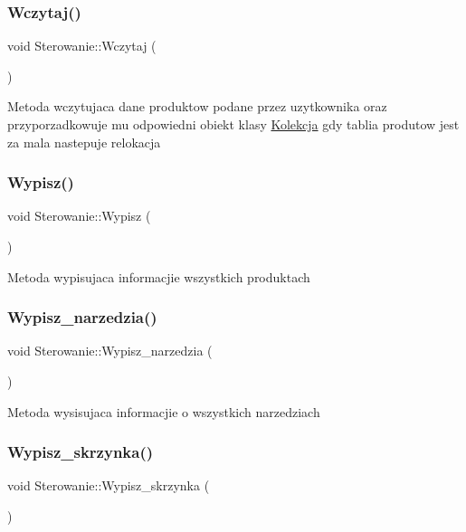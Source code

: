 \subsubsection{\texorpdfstring{Wczytaj()}{Wczytaj()}}
{\footnotesize\ttfamily void Sterowanie\+::\+Wczytaj (\begin{DoxyParamCaption}{ }\end{DoxyParamCaption})}

Metoda wczytujaca dane produktow podane przez uzytkownika oraz przyporzadkowuje mu odpowiedni obiekt klasy \mbox{\hyperlink{class_kolekcja}{Kolekcja}} gdy tablia produtow jest za mala nastepuje relokacja \mbox{\label{class_sterowanie_a13ce815612492fcc3837c7779def228e}} 
\subsubsection{\texorpdfstring{Wypisz()}{Wypisz()}}
{\footnotesize\ttfamily void Sterowanie\+::\+Wypisz (\begin{DoxyParamCaption}{ }\end{DoxyParamCaption})}

Metoda wypisujaca informacjie wszystkich produktach \mbox{\label{class_sterowanie_ab11ff3f1364a7b9bb115e927f217f372}} 
\subsubsection{\texorpdfstring{Wypisz\+\_\+narzedzia()}{Wypisz\_narzedzia()}}
{\footnotesize\ttfamily void Sterowanie\+::\+Wypisz\+\_\+narzedzia (\begin{DoxyParamCaption}{ }\end{DoxyParamCaption})}

Metoda wysisujaca informacjie o wszystkich narzedziach \mbox{\label{class_sterowanie_a4b0434e74486dfb72bfdc81e93e3c74a}} 
\subsubsection{\texorpdfstring{Wypisz\+\_\+skrzynka()}{Wypisz\_skrzynka()}}
{\footnotesize\ttfamily void Sterowanie\+::\+Wypisz\+\_\+skrzynka (\begin{DoxyParamCaption}{ }\end{DoxyParamCaption})}

